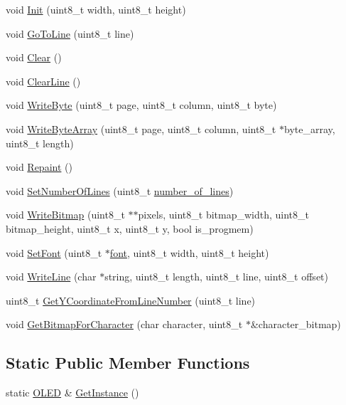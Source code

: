 \begin{DoxyCompactItemize}
\item 
void \hyperlink{class_o_l_e_d_a2c8205c8eac9d7a2b181657561e9b4d2}{Init} (uint8\-\_\-t width, uint8\-\_\-t height)
\item 
void \hyperlink{class_o_l_e_d_a8d314130676b104ed959b92ab4bac25e}{Go\-To\-Line} (uint8\-\_\-t line)
\item 
void \hyperlink{class_o_l_e_d_a6c7bb1fc91b3e574a275f90643da140a}{Clear} ()
\item 
void \hyperlink{class_o_l_e_d_a3a571f5ea7a183fa14932cd5b2c423eb}{Clear\-Line} ()
\item 
void \hyperlink{class_o_l_e_d_a7fa307269dbd2e80a6e48a1442df83d2}{Write\-Byte} (uint8\-\_\-t page, uint8\-\_\-t column, uint8\-\_\-t byte)
\item 
void \hyperlink{class_o_l_e_d_a7fffc17a5439300d361414c15a7a2dbe}{Write\-Byte\-Array} (uint8\-\_\-t page, uint8\-\_\-t column, uint8\-\_\-t $\ast$byte\-\_\-array, uint8\-\_\-t length)
\item 
void \hyperlink{class_o_l_e_d_a3efa34861b4ae0bc5323f6b7cf1d8a01}{Repaint} ()
\item 
void \hyperlink{class_o_l_e_d_aa3c88e19f05340036ea5ac9e2d1ea5dc}{Set\-Number\-Of\-Lines} (uint8\-\_\-t \hyperlink{class_o_l_e_d_a9ea1c55112deede1a61142af276a6bc9}{number\-\_\-of\-\_\-lines})
\item 
void \hyperlink{class_o_l_e_d_a3cb468f16387343f6db387a86cded8af}{Write\-Bitmap} (uint8\-\_\-t $\ast$$\ast$pixels, uint8\-\_\-t bitmap\-\_\-width, uint8\-\_\-t bitmap\-\_\-height, uint8\-\_\-t x, uint8\-\_\-t y, bool is\-\_\-progmem)
\item 
void \hyperlink{class_o_l_e_d_abe6073c961cadc4c9b693eb8dc8198bd}{Set\-Font} (uint8\-\_\-t $\ast$\hyperlink{class_o_l_e_d_a29ab86a4a73f4d343bf1810927f0911d}{font}, uint8\-\_\-t width, uint8\-\_\-t height)
\item 
void \hyperlink{class_o_l_e_d_a0ffccb4fd874b997c869c5d511f76df8}{Write\-Line} (char $\ast$string, uint8\-\_\-t length, uint8\-\_\-t line, uint8\-\_\-t offset)
\item 
uint8\-\_\-t \hyperlink{class_o_l_e_d_a5b6d41d5d699998f54ea6e3b6562ac5b}{Get\-Y\-Coordinate\-From\-Line\-Number} (uint8\-\_\-t line)
\item 
void \hyperlink{class_o_l_e_d_a3bd2f2f05568441e1e0533eaf0db58f8}{Get\-Bitmap\-For\-Character} (char character, uint8\-\_\-t $\ast$\&character\-\_\-bitmap)
\end{DoxyCompactItemize}
\subsection*{Static Public Member Functions}
\begin{DoxyCompactItemize}
\item 
static \hyperlink{class_o_l_e_d}{O\-L\-E\-D} \& \hyperlink{class_o_l_e_d_a7b261492679b5e67d346e97ed575332e}{Get\-Instance} ()
\end{DoxyCompactItemize}
